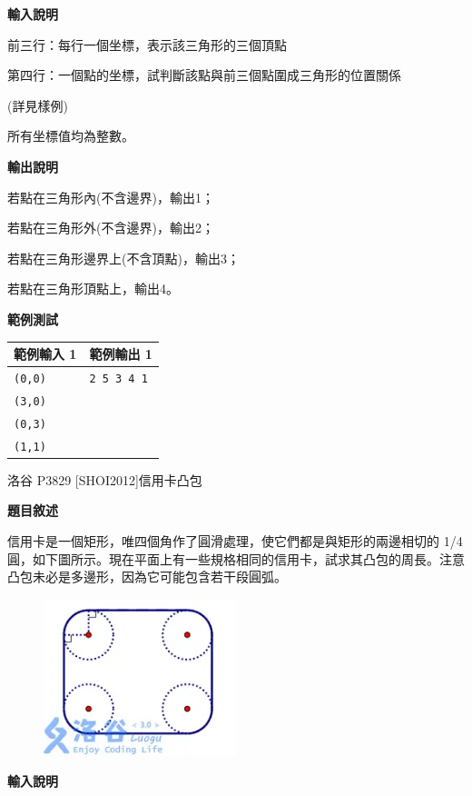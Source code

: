     \textbf{輸入說明}

    前三行：每行一個坐標，表示該三角形的三個頂點

    第四行：一個點的坐標，試判斷該點與前三個點圍成三角形的位置關係

    (詳見樣例)

    所有坐標值均為整數。

    \textbf{輸出說明}

    若點在三角形內(不含邊界)，輸出1；

    若點在三角形外(不含邊界)，輸出2；

    若點在三角形邊界上(不含頂點)，輸出3；

    若點在三角形頂點上，輸出4。

    \textbf{範例測試}

    \begin{tabular}{|m{7cm}|m{7cm}|}
        \hline
        範例輸入 1 & 範例輸出 1 \\
        \hline
        \verb|(0,0)| & \verb|2 5 3 4 1| \\
        \verb|(3,0)| & \\
        \verb|(0,3)| & \\
        \verb|(1,1)| & \\
        \hline
    \end{tabular}

    \problem 洛谷 P3829 [SHOI2012]信用卡凸包

    \textbf{題目敘述}

    信用卡是一個矩形，唯四個角作了圓滑處理，使它們都是與矩形的兩邊相切的 1/4 圓，如下圖所示。現在平面上有一些規格相同的信用卡，試求其凸包的周長。注意凸包未必是多邊形，因為它可能包含若干段圓弧。

    \begin{figure}[!htbp]
        \centering
        \includegraphics[width=0.5\textwidth]{../Images/Vector3.png}
    \end{figure}

    \textbf{輸入說明}


